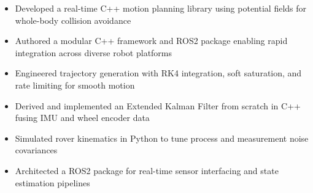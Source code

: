 \documentclass[10pt,a4paper,ragged2e,withhyper]{altacv}
\begin{document}
    \vspace{-1.5em}
    \begin{itemize}
        \item Developed a real-time C++ motion planning library using potential fields for whole-body collision avoidance
        \item Authored a modular C++ framework and ROS2 package enabling rapid integration across diverse robot platforms
        \item Engineered trajectory generation with RK4 integration, soft saturation, and rate limiting for smooth motion
    \end{itemize}
    \begin{itemize}
        \item Derived and implemented an Extended Kalman Filter from scratch in C++ fusing IMU and wheel encoder data
        \item Simulated rover kinematics in Python to tune process and measurement noise covariances
        \item Architected a ROS2 package for real-time sensor interfacing and state estimation pipelines
    \end{itemize}
\end{document}
